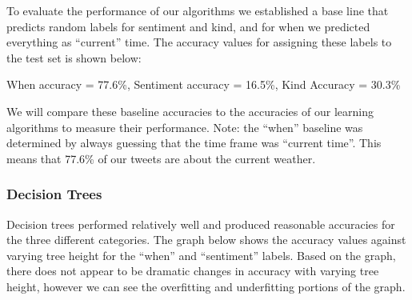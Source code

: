 	To evaluate the performance of our algorithms we established a base line that predicts random labels for sentiment and kind, and for when we predicted everything as ``current'' time. The accuracy values for assigning these labels to the test set is shown below:

\begin{center}
When accuracy = 77.6\%, Sentiment accuracy  = 16.5\%, Kind Accuracy = 30.3\%
\end{center}

	We will compare these baseline accuracies to the accuracies of our learning algorithms to measure their performance. Note: the ``when'' baseline was determined by always guessing that the time frame was ``current time''. This means that 77.6\% of our tweets are about the current weather. 

\subsubsection{Decision Trees}
	Decision trees performed relatively well and produced reasonable accuracies for the three different categories. The graph below shows the accuracy values against varying tree height for the ``when'' and ``sentiment'' labels. Based on the graph, there does not appear to be dramatic changes in accuracy with varying tree height, however we can see the overfitting and underfitting portions of the graph. 

\begin{figure}[H]
\noindent{}
\end{figure}

